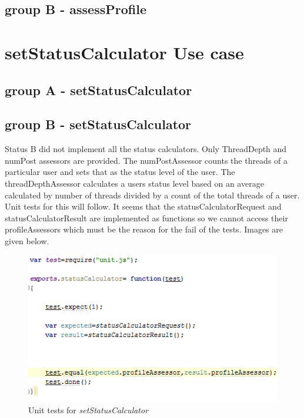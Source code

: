 \documentclass[a4paper,12pt]{article}
\begin{document}
\subsection{group B - assessProfile}



\newpage
\section{setStatusCalculator Use case}
\subsection{group A - setStatusCalculator}


\subsection{group B - setStatusCalculator}
Status B did not implement all the status calculators. Only ThreadDepth and numPost assessors are provided. The numPostAssessor counts the threads of a particular user and sets that as the status level of the user. The threadDepthAssessor calculates a users status level based on an average calculated by number of threads divided by a count of the total threads of a user. Unit tests for this will follow.
It seems that the statusCalculatorRequest and statusCalculatorResult are implemented as functions so we cannot access their profileAssessors which must be the reason for the fail of the tests. Images are given below.

	\begin{figure}
		\includegraphics[width=1.0\textwidth]{Figures/StatusCalculatorTest.png}
		\caption{Unit tests for \textit{setStatusCalculator}}
	\end{figure}
\end{document}
